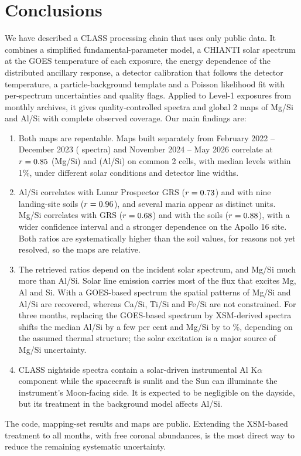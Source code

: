 \section{Conclusions}\label{sec:conclusions}

We have described a CLASS processing chain that uses only public data. It combines a simplified fundamental-parameter model, a CHIANTI solar spectrum at the GOES temperature of each exposure, the energy dependence of the distributed ancillary response, a detector calibration that follows the detector temperature, a particle-background template and a Poisson likelihood fit with per-spectrum uncertainties and quality flags. Applied to \NRawFiles{} Level-1 exposures from \NMonths{} monthly archives, it gives \NMapped{} quality-controlled spectra and global 2\textdegree{} maps of Mg/Si and Al/Si with complete observed coverage. Our main findings are:
\begin{enumerate}
\item Both maps are repeatable. Maps built separately from February 2022 -- December 2023 (\EpBNFp{} spectra) and November 2024 -- May 2026 correlate at $r=0.85$ (Mg/Si) and \EpAlTwoR{} (Al/Si) on common 2\textdegree{} cells, with median levels within 1\%, under different solar conditions and detector line widths.
\item Al/Si correlates with Lunar Prospector GRS ($r=0.73$) and with nine landing-site soils ($r=0.96$), and several maria appear as distinct units. Mg/Si correlates with GRS ($r=0.68$) and with the soils ($r=0.88$), with a wider confidence interval and a stronger dependence on the Apollo 16 site. Both ratios are systematically higher than the soil values, for reasons not yet resolved, so the maps are relative.
\item The retrieved ratios depend on the incident solar spectrum, and Mg/Si much more than Al/Si. Solar line emission carries most of the flux that excites Mg, Al and Si. With a GOES-based spectrum the spatial patterns of Mg/Si and Al/Si are recovered, whereas Ca/Si, Ti/Si and Fe/Si are not constrained. For three months, replacing the GOES-based spectrum by XSM-derived spectra shifts the median Al/Si by a few per cent and Mg/Si by \XsmTwoMg{} to \XsmOneMg\%, depending on the assumed thermal structure; the solar excitation is a major source of Mg/Si uncertainty.
\item CLASS nightside spectra contain a solar-driven instrumental Al K$\alpha$ component while the spacecraft is sunlit and the Sun can illuminate the instrument's Moon-facing side. It is expected to be negligible on the dayside, but its treatment in the background model affects Al/Si.
\end{enumerate}
The code, mapping-set results and maps are public. Extending the XSM-based treatment to all months, with free coronal abundances, is the most direct way to reduce the remaining systematic uncertainty.
